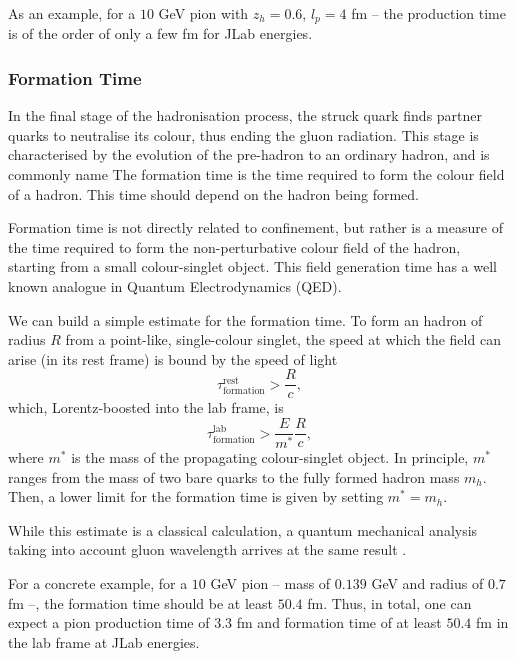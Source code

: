         As an example, for a $10$ GeV pion with $z_h = 0.6$, $l_p = 4$ fm -- the production time is of the order of only a few fm for JLab energies.

    \subsubsection{Formation Time}
        In the final stage of the hadronisation process, the struck quark finds partner quarks to neutralise its colour, thus ending the gluon radiation.
        This stage is characterised by the evolution of the pre-hadron to an ordinary hadron, and is commonly name
        The formation time is the time required to form the colour field of a hadron.
        This time should depend on the hadron being formed.

        Formation time is not directly related to confinement, but rather is a measure of the time required to form the non-perturbative colour field of the hadron, starting from a small colour-singlet object.
        This field generation time has a well known analogue in Quantum Electrodynamics (QED).

        We can build a simple estimate for the formation time.
        To form an hadron of radius $R$ from a point-like, single-colour singlet, the speed at which the field can arise (in its rest frame) is bound by the speed of light
        \begin{equation*}
            \tau^\text{rest}_\text{formation} > \frac{R}{c},
        \end{equation*}
        which, Lorentz-boosted into the lab frame, is
        \begin{equation*}
            \tau^\text{lab}_\text{formation} > \frac{E}{m^*} \frac{R}{c},
        \end{equation*}
        where $m^*$ is the mass of the propagating colour-singlet object.
        In principle, $m^*$ ranges from the mass of two bare quarks to the fully formed hadron mass $m_h$.
        Then, a lower limit for the formation time is given by setting $m^* = m_h$.

        While this estimate is a classical calculation, a quantum mechanical analysis taking into account gluon wavelength arrives at the same result \cite{dokshitzer1991}.

        For a concrete example, for a $10$ GeV pion -- mass of $0.139$ GeV and radius of $0.7$ fm --, the formation time should be at least $50.4$ fm.
        Thus, in total, one can expect a pion production time of $3.3$ fm and formation time of at least $50.4$ fm in the lab frame at JLab energies.
